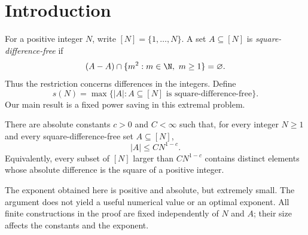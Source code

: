 \section{Introduction}
\label{sec:introduction}

For a positive integer $N$, write $[N]=\{1,\ldots,N\}$. A set
$A\subseteq[N]$ is \emph{square-difference-free} if
\[
 (A-A)\cap\{m^2:m\in\N,\ m\ge1\}=\varnothing.
\]
Thus the restriction concerns differences in the integers. Define
\[
 s(N)=\max\{|A|:A\subseteq[N]\text{ is square-difference-free}\}.
\]
Our main result is a fixed power saving in this extremal problem.

\begin{theorem}
\label{thm:main}
There are absolute constants $c>0$ and $C<\infty$ such that, for every
integer $N\ge1$ and every square-difference-free set $A\subseteq[N]$,
\[
 |A|\le C N^{1-c}.
\]
Equivalently, every subset of $[N]$ larger than $C N^{1-c}$ contains
distinct elements whose absolute difference is the square of a positive
integer.
\end{theorem}

The exponent obtained here is positive and absolute, but extremely small.
The argument does not yield a useful numerical value or an optimal exponent.
All finite constructions in the proof are fixed independently of $N$ and
$A$; their size affects the constants and the exponent.
